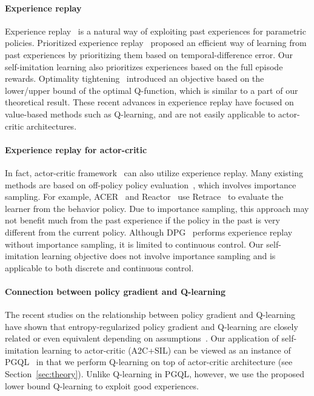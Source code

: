 \documentclass{article}
\newcommand{\cutparagraphup}{\vspace*{-0.05in}}\newcommand{\cutparagraphdown}{\vspace*{-0.02in}}
\begin{document}
\cutparagraphup
\paragraph{Experience replay}
Experience replay~\citep{Lin1992SelfImprovingRA} is a natural way of exploiting past experiences for parametric policies. Prioritized experience replay~\citep{Moore1992MemoryBasedRL,Schaul2015PrioritizedER} proposed an efficient way of learning from past experiences by prioritizing them based on temporal-difference error. Our self-imitation learning also prioritizes experiences based on the full episode rewards. Optimality tightening~\citep{He2016LearningTP} introduced an objective based on the lower/upper bound of the optimal Q-function, which is similar to a part of our theoretical result. These recent advances in experience replay have focused on value-based methods such as Q-learning, and are not easily applicable to actor-critic architectures. 

\cutparagraphup
\paragraph{Experience replay for actor-critic}
In fact, actor-critic framework~\citep{sutton1999policy,konda2000actor} can also utilize experience replay. Many existing methods are based on off-policy policy evaluation~\citep{Precup2001OffPolicyTD,Precup2000EligibilityTF}, which involves importance sampling. For example, ACER~\citep{Wang2016SampleEA} and Reactor~\citep{Gruslys2017TheRA} use Retrace~\citep{Munos2016SafeAE} to evaluate the learner from the behavior policy. Due to importance sampling, this approach may not benefit much from the past experience if the policy in the past is very different from the current policy. Although DPG~\citep{silver2014deterministic,lillicrap2015continuous} performs experience replay without importance sampling, it is limited to continuous control. Our self-imitation learning objective does not involve importance sampling and is applicable to both discrete and continuous control.

\cutparagraphup
\paragraph{Connection between policy gradient and Q-learning}
The recent studies on the relationship between policy gradient and Q-learning have shown that entropy-regularized policy gradient and Q-learning are closely related or even equivalent depending on assumptions~\citep{Nachum2017BridgingTG,ODonoghue2016CombiningPG,Schulman2017EquivalenceBP,Haarnoja2017ReinforcementLW}. Our application of self-imitation learning to actor-critic (A2C+SIL) can be viewed as an instance of PGQL~\citep{ODonoghue2016CombiningPG} in that we perform Q-learning on top of actor-critic architecture (see Section~\ref{sec:theory}). Unlike Q-learning in PGQL, however, we use the proposed lower bound Q-learning to exploit good experiences.
\end{document}

